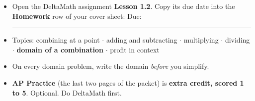\documentclass[aspectratio=169, 11pt]{beamer}
\begin{document}
\begin{frame}[t, plain]

  \begin{itemize}\setlength{\itemsep}{8pt}
    \item Open the DeltaMath assignment \textbf{Lesson 1.2}. Copy its due date
          into the \textbf{Homework} row of your cover sheet:
          \quad Due: \rule{3cm}{0.4pt}
    \item Topics: combining at a point $\cdot$ adding and subtracting
          $\cdot$ multiplying $\cdot$ dividing $\cdot$ \textbf{domain of a
          combination} $\cdot$ profit in context
    \item On every domain problem, write the domain \textit{before} you simplify.
    \item \textbf{AP Practice} (the last two pages of the packet) is
          \textbf{extra credit, scored 1 to 5}. Optional. Do DeltaMath first.
  \end{itemize}
\end{frame}
\end{document}
